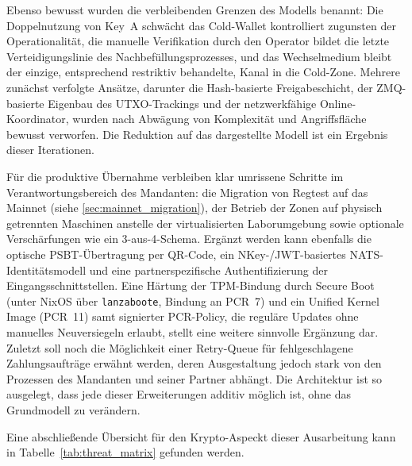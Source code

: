 Ebenso bewusst wurden die verbleibenden Grenzen des Modells benannt: 
Die Doppelnutzung von Key~A schwächt das Cold-Wallet kontrolliert zugunsten der Operationalität, die manuelle Verifikation durch den Operator bildet die letzte Verteidigungslinie des Nachbefüllungsprozesses, und das Wechselmedium bleibt der einzige, entsprechend restriktiv behandelte, Kanal in die Cold-Zone. Mehrere zunächst verfolgte Ansätze, darunter die Hash-basierte Freigabeschicht, der \ac{ZMQ}-basierte Eigenbau des \ac{UTXO}-Trackings und der netzwerkfähige Online-Koordinator, wurden nach Abwägung von Komplexität und Angriffsfläche bewusst verworfen. Die Reduktion auf das dargestellte Modell ist ein Ergebnis dieser Iterationen.

Für die produktive Übernahme verbleiben klar umrissene Schritte im Verantwortungsbereich des Mandanten: die Migration von Regtest auf das Mainnet (siehe \ref{sec:mainnet_migration}), der Betrieb der Zonen auf physisch getrennten Maschinen anstelle der virtualisierten Laborumgebung sowie optionale Verschärfungen wie ein 3-aus-4-Schema. Ergänzt werden kann ebenfalls die optische \ac{PSBT}-Übertragung per \ac{QR}-Code, ein NKey-/JWT-basiertes \ac{NATS}-Identitätsmodell und eine partnerspezifische Authentifizierung der Eingangsschnittstellen. 
Eine Härtung der \ac{TPM}-Bindung durch Secure Boot (unter NixOS über \texttt{lanzaboote}, Bindung an \ac{PCR}~7) und ein Unified Kernel Image (\ac{PCR}~11) samt signierter \ac{PCR}-Policy, die reguläre Updates ohne manuelles Neuversiegeln erlaubt, stellt eine weitere sinnvolle Ergänzung dar.
Zuletzt soll noch die Möglichkeit einer Retry-Queue für fehlgeschlagene Zahlungsaufträge erwähnt werden, deren Ausgestaltung jedoch stark von den Prozessen des Mandanten und seiner Partner abhängt. 
Die Architektur ist so ausgelegt, dass jede dieser Erweiterungen additiv möglich ist, ohne das Grundmodell zu verändern.

Eine abschließende Übersicht für den Krypto-Aspeckt dieser Ausarbeitung kann in Tabelle~\ref{tab:threat_matrix} gefunden werden.

